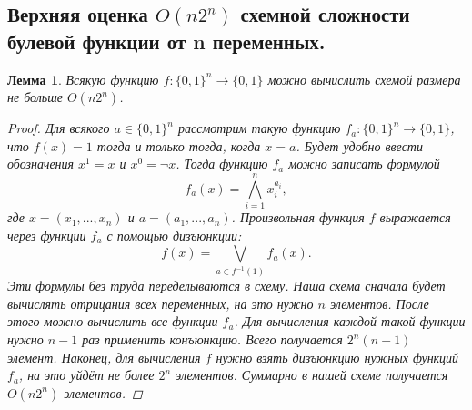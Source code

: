 \documentclass{article}
\newtheorem{lemma}{Лемма}
\begin{document}
\subsection{Верхняя оценка $O(n2^n)$ схемной сложности булевой функции от n переменных.}
\begin{lemma}
Всякую функцию $f : \{0, 1\}^n \to \{0, 1\}$ можно вычислить схемой размера не больше $O(n2^n)$.
\begin{proof}
Для всякого $a \in \{0, 1\}^n$ рассмотрим такую функцию $f_a : \{0, 1\}^n \to \{0, 1\}$, что $f (x) = 1$ тогда и только тогда, когда $x = a$. Будет удобно ввести обозначения $x^1 = x$ и $x^0 = \neg x$. Тогда функцию $f_a$ можно записать формулой
\[
f_a(x) = \bigwedge_{i=1}^n x_i^{a_i},
\]
где $x = (x_1,...,x_n)$ и $a = (a_1,...,a_n)$.
\newline
Произвольная функция $f$ выражается через функции $f_a$ с помощью дизъюнкции:
\[
f(x) = \bigvee_{a \in f^{-1}(1)} f_a(x).
\]
Эти формулы без труда переделываются в схему. Наша схема сначала будет вычислять отрицания всех переменных, на это нужно $n$ элементов. После этого можно вычислить все функции $f_a$. Для вычисления каждой такой функции нужно $n-1$ раз применить конъюнкцию. Всего получается $2^n(n-1)$ элемент. Наконец, для вычисления $f$ нужно взять дизъюнкцию нужных функций $f_a$, на это уйдёт не более $2^n$ элементов. Суммарно в нашей схеме получается $O(n2^n)$ элементов.
\end{proof}
\end{lemma}
\end{document}
